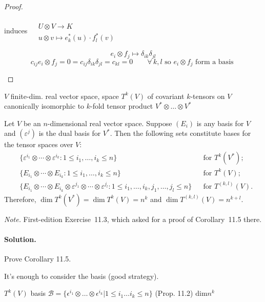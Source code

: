 \begin{proof}
\begin{enumerate}
induces $\begin{aligned} & \quad \\ 
  & U\otimes V \to K \\ 
   & u \otimes v \mapsto e^*_k(u) \cdot f_l^*(v) \end{aligned}$

\[
e_i \otimes f_j \mapsto \delta_{ik} \delta_{jl}
\]
\[
c_{ij} e_i \otimes f_j = 0 = c_{ij} \delta_{ik} \delta_{jl} = c_{kl} = 0 \quad \quad \forall \, k,l \text{ so } e_i\otimes f_j \text{ form a basis }
\]

\end{enumerate}
\end{proof}



\begin{corollary}[11.5] $V$ finite-dim. real vector space, space $T^k(V)$ of covariant $k$-tensors on $V$ canonically isomorphic to $k$-fold tensor product $V^* \otimes \dots \otimes V^*$
\end{corollary}

\begin{exercise}
Let $V$ be an $n$-dimensional real vector space. Suppose $(E_i)$ is any basis for $V$ and $(\varepsilon^j)$ is the dual basis for $V^*$. Then the following sets constitute bases for the tensor spaces over $V$:
\begin{align*}
&\{\varepsilon^{i_1}\otimes\cdots\otimes\varepsilon^{i_k}:1\le i_1,\ldots,i_k\le n\}&&\text{for }T^k(V^*);\\
&\{E_{i_1}\otimes\cdots\otimes E_{i_k}:1\le i_1,\ldots,i_k\le n\}&&\text{for }T^k(V);\\
&\{E_{i_1}\otimes\cdots\otimes E_{i_k}\otimes\varepsilon^{j_1}\otimes\cdots\otimes\varepsilon^{j_l}:1\le i_1,\ldots,i_k,j_1,\ldots,j_l\le n\}&&\text{for }T^{(k,l)}(V).
\end{align*}
Therefore, $\dim T^k(V^*)=\dim T^k(V)=n^k$ and $\dim T^{(k,l)}(V)=n^{k+l}$.
\end{exercise}
\noindent\emph{Note.} First-edition Exercise~11.3, which asked for a proof of Corollary~11.5 there.
\paragraph{Solution.} Prove Corollary 11.5.  

It's enough to consider the basis (good strategy).  

$T^k(V)$ basis $\mathcal{B} = \lbrace \epsilon^{i_1} \otimes \dots \otimes \epsilon^{i_k} | 1 \leq i_1 \dots i_k \leq n \rbrace$ (Prop. 11.2) $\text{dim}{n^k}$

